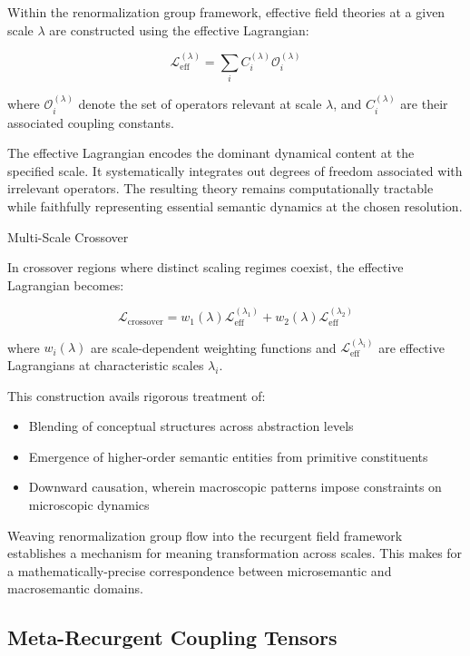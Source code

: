 Within the renormalization group framework, effective field theories at a given scale \(\lambda\) are constructed using the effective Lagrangian:

\begin{equation}
\mathcal{L}_{\mathrm{eff}}^{(\lambda)} = \sum_{i} C_{i}^{(\lambda)} \mathcal{O}_{i}^{(\lambda)}
\end{equation}

where \(\mathcal{O}_{i}^{(\lambda)}\) denote the set of operators relevant at scale \(\lambda\), and \(C_{i}^{(\lambda)}\) are their associated coupling constants.

The effective Lagrangian encodes the dominant dynamical content at the specified scale. It systematically integrates out degrees of freedom associated with irrelevant operators. The resulting theory remains computationally tractable while faithfully representing essential semantic dynamics at the chosen resolution.

Multi-Scale Crossover

In crossover regions where distinct scaling regimes coexist, the effective Lagrangian becomes:

\begin{equation}
\mathcal{L}_{\text{crossover}} = w_1(\lambda) \mathcal{L}_{\text{eff}}^{(\lambda_1)} + w_2(\lambda) \mathcal{L}_{\text{eff}}^{(\lambda_2)}
\end{equation}

where \(w_i(\lambda)\) are scale-dependent weighting functions and \(\mathcal{L}_{\text{eff}}^{(\lambda_i)}\) are effective Lagrangians at characteristic scales \(\lambda_i\).

This construction avails rigorous treatment of:
\begin{itemize}
    \item Blending of conceptual structures across abstraction levels
    \item Emergence of higher-order semantic entities from primitive constituents
    \item Downward causation, wherein macroscopic patterns impose constraints on microscopic dynamics
\end{itemize}

Weaving renormalization group flow into the recurgent field framework establishes a mechanism for meaning transformation across scales. This makes for a mathematically-precise correspondence between microsemantic and macrosemantic domains.

\subsection{Meta-Recurgent Coupling Tensors}


